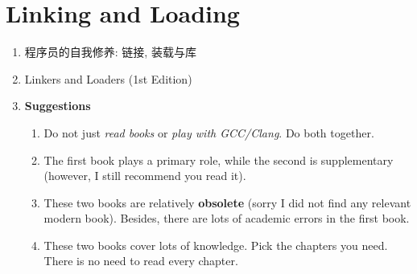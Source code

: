 \documentclass{article}
\begin{document}
\section{Linking and Loading}
\begin{enumerate}
    \item 
    \begin{CJK}{UTF8}{gbsn}
    程序员的自我修养: 链接, 装载与库 \cite{selfcultivation}
    \end{CJK}
    \item Linkers and Loaders (1st Edition) \cite{levine264linkers}
    \item \textbf{Suggestions}
    \begin{enumerate}
        \item Do not just \emph{read books} or \emph{play with GCC/Clang}.
        Do both together.
        \item The first book plays a primary role, while the second is supplementary (however, I still recommend you read it).
        \item These two books are relatively \textbf{obsolete} (sorry I did not find any relevant modern book).
        Besides, there are lots of academic errors in the first book.
        \item These two books cover lots of knowledge.
        Pick the chapters you need.
        There is no need to read every chapter.
    \end{enumerate}
\end{enumerate}
\end{document}
